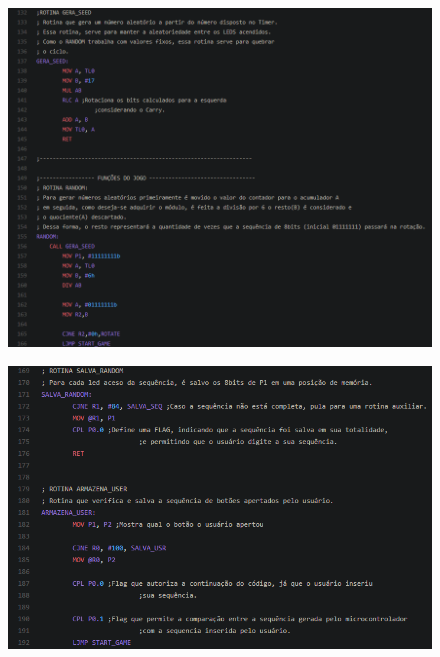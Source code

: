 \documentclass{article}
\begin{document}
\begin{figure}[H]
\hspace*{-1.0in}
\includegraphics[scale=1]{5.PNG}
\end{figure}
\begin{figure}[H]
\hspace*{-1.0in}
\includegraphics[scale=1]{6.PNG}
\end{figure}
\end{document}
